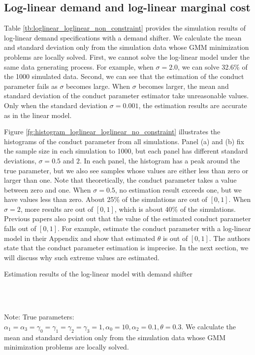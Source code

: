 \documentclass[11pt, a4paper]{article}
\begin{document}
\subsection{Log-linear demand and log-linear marginal cost}\label{subsec:log_linear_demand_and_log_linear_marginal_cost}
Table \ref{tb:loglinear_loglinear_non_constraint} provides the simulation results of log-linear demand specifications with a demand shifter.
We calculate the mean and standard deviation only from the simulation data whose GMM minimization problems are locally solved. 
First, we cannot solve the log-linear model under the same data generating process. For example, when $\sigma=2.0$, we can solve 32.6\% of the 1000 simulated data.
Second, we can see that the estimation of the conduct parameter fails as $\sigma$ becomes large. 
When $\sigma$ becomes larger, the mean and standard deviation of the conduct parameter estimator take unreasonable values.
Only when the standard deviation $\sigma = 0.001$, the estimation results are accurate as in the linear model. 

Figure \ref{fg:histogram_loglinear_loglinear_no_constraint} illustrates the histograms of the conduct parameter from all simulations.
Panel (a) and (b) fix the sample size in each simulation to 1000, but each panel has different standard deviations, $\sigma = 0.5$ and $2$.
In each panel, the histogram has a peak around the true parameter, but we also see samples whose values are either less than zero or larger than one.
Note that theoretically, the conduct parameter takes a value between zero and one.
When $\sigma = 0.5$, no estimation result exceeds one, but we have values less than zero.
About 25\% of the simulations are out of $[0,1]$.
When $\sigma = 2$, more results are out of $[0,1]$, which is about 40\% of the simulations. 
Previous papers also point out that the value of the estimated conduct parameter falls out of $[0,1]$.
For example, \citet{okazaki2022excess} estimate the conduct parameter with a log-linear model in their Appendix and show that estimated $\theta$ is out of $[0,1]$.
The authors state that the conduct parameter estimation is imprecise.
In the next section, we will discuss why such extreme values are estimated.


\begin{table}[!htbp]
      \begin{center}
          \caption{Estimation results of the log-linear model with demand shifter}
          \label{tb:loglinear_loglinear_non_constraint} 
          \subfloat[$\sigma=0.001$]{}\\
          \subfloat[$\sigma=0.5$]{}\\
      \end{center}\footnotesize
      Note: True parameters: $\alpha_1 = \alpha_3 = \gamma_0 = \gamma_1 = \gamma_2  = \gamma_3 = 1, \alpha_0 = 10, \alpha_2 = 0.1,  \theta = 0.3.$ We calculate the mean and standard deviation only from the simulation data whose GMM minimization problems are locally solved.  
\end{table} 
\end{document}
